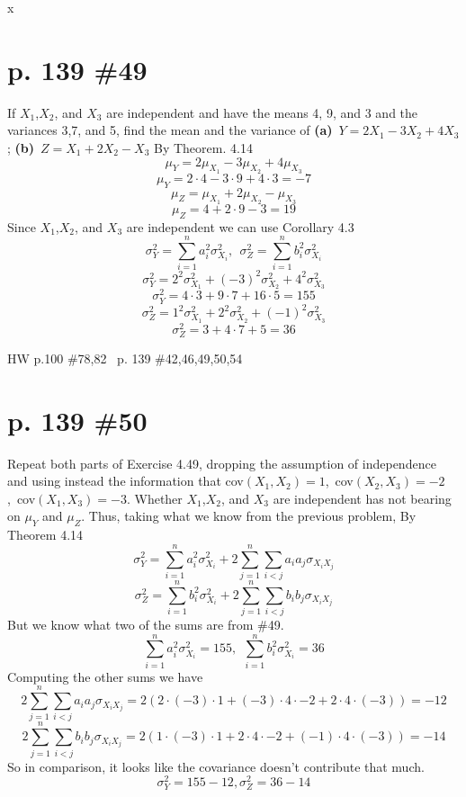 x\documentclass[12pt]{article}
\begin{document}
\section[20pt]{p. 139 \#49}
If \(X_1\),\(X_2\), and \(X_3\) are independent and have the means 4, 9, and 3 and the variances 3,7, and 5, find the mean and the variance of \newline
\textbf{(a)}\ \(Y=2X_1-3X_2+4X_3\); \newline
\textbf{(b)}\ \(Z=X_1+2X_2-X_3\) \newline \newline
By Theorem. 4.14
\[\mu_{Y}=2\mu_{X_1}-3\mu_{X_2}+4\mu_{X_3}\]
\[\mu_{Y}=2\cdot4-3\cdot9+4\cdot3=-7\]
\newline
\[\mu_{Z}=\mu_{X_1}+2\mu_{X_2}-\mu_{X_3}\]
\[\mu_{Z}=4+2\cdot9-3=19\]
 \newline \newline
Since \(X_1\),\(X_2\), and \(X_3\) are independent we can use Corollary 4.3
\[\sigma^2_Y=\sum_{i=1}^na_i^2\sigma^2_{X_i},\ \ \sigma^2_Z=\sum_{i=1}^nb_i^2\sigma^2_{X_i}\]
\[\sigma^2_Y=2^2\sigma_{X_1}^2+(-3)^2\sigma_{X_2}^2+4^2\sigma_{X_3}^2\]
\[\sigma^2_Y=4\cdot3+9\cdot7+16\cdot5=155\]
\newline
\[\sigma^2_Z=1^2\sigma_{X_1}^2+2^2\sigma_{X_2}^2+(-1)^2\sigma_{X_3}^2\]
\[\sigma^2_Z=3+4\cdot7+5=36\]
\newpage
\maketitle HW p.100 \#78,82 \ p. 139 \#42,46,49,50,54
\section[20pt]{p. 139 \#50}
Repeat both parts of Exercise 4.49, dropping the assumption of independence and using instead the information that cov\((X_1,X_2)=1\),\ cov\((X_2,X_3)=-2\),\ cov\((X_1,X_3)=-3\). \newline \newline
Whether \(X_1\),\(X_2\), and \(X_3\) are independent has not bearing on \(\mu_Y\) and \(\mu_Z\). Thus, taking what we know from the previous problem, \newline
{} \newline \newline
By Theorem 4.14
\[\sigma^2_Y=\sum_{i=1}^na_i^2\sigma^2_{X_i}+2\sum_{j=1}^n\sum_{i<j}a_ia_j\sigma_{X_iX_j}\]
\[\sigma^2_Z=\sum_{i=1}^nb_i^2\sigma^2_{X_i}+2\sum_{j=1}^n\sum_{i<j}b_ib_j\sigma_{X_iX_j}\]
But we know what two of the sums are from \#49.
\[\sum_{i=1}^na_i^2\sigma^2_{X_i}=155,\ \ \sum_{i=1}^nb_i^2\sigma^2_{X_i}=36\]
Computing the other sums we have
\[2\sum_{j=1}^n\sum_{i<j}a_ia_j\sigma_{X_iX_j}=2(2\cdot(-3)\cdot1+(-3)\cdot4\cdot-2+2\cdot4\cdot(-3))=-12\]
\[2\sum_{j=1}^n\sum_{i<j}b_ib_j\sigma_{X_iX_j}=2(1\cdot(-3)\cdot1+2\cdot4\cdot-2+(-1)\cdot4\cdot(-3))=-14\]
So in comparison, it looks like the covariance doesn't contribute that much. \newline
\[\sigma^2_Y=155-12,\sigma^2_Z=36-14\]
\end{document}
